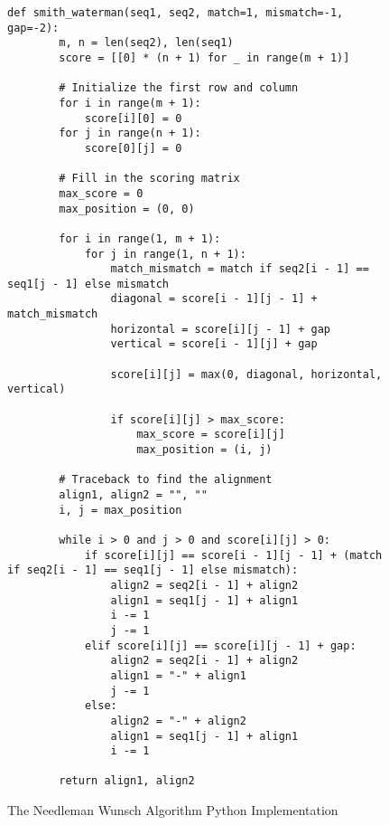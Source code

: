 \begin{figure}[H]
    \centering
    \begin{lstlisting}[basicstyle=\footnotesize]
    def smith_waterman(seq1, seq2, match=1, mismatch=-1, gap=-2):
        m, n = len(seq2), len(seq1)
        score = [[0] * (n + 1) for _ in range(m + 1)]
    
        # Initialize the first row and column
        for i in range(m + 1):
            score[i][0] = 0
        for j in range(n + 1):
            score[0][j] = 0
    
        # Fill in the scoring matrix
        max_score = 0
        max_position = (0, 0)
    
        for i in range(1, m + 1):
            for j in range(1, n + 1):
                match_mismatch = match if seq2[i - 1] == seq1[j - 1] else mismatch
                diagonal = score[i - 1][j - 1] + match_mismatch
                horizontal = score[i][j - 1] + gap
                vertical = score[i - 1][j] + gap
    
                score[i][j] = max(0, diagonal, horizontal, vertical)
    
                if score[i][j] > max_score:
                    max_score = score[i][j]
                    max_position = (i, j)
    
        # Traceback to find the alignment
        align1, align2 = "", ""
        i, j = max_position
    
        while i > 0 and j > 0 and score[i][j] > 0:
            if score[i][j] == score[i - 1][j - 1] + (match if seq2[i - 1] == seq1[j - 1] else mismatch):
                align2 = seq2[i - 1] + align2
                align1 = seq1[j - 1] + align1
                i -= 1
                j -= 1
            elif score[i][j] == score[i][j - 1] + gap:
                align2 = seq2[i - 1] + align2
                align1 = "-" + align1
                j -= 1
            else:
                align2 = "-" + align2
                align1 = seq1[j - 1] + align1
                i -= 1
    
        return align1, align2
    \end{lstlisting}
    \caption{The Needleman Wunsch Algorithm Python Implementation}
    \label{fig:smith-waterman}
\end{figure}

